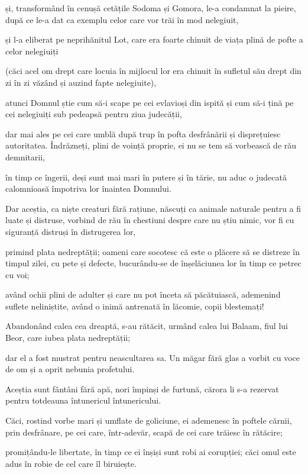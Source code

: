 {și, transformând în cenușă cetățile Sodoma și Gomora, le-a condamnat la pieire, după ce le-a dat ca exemplu celor care vor trăi în mod nelegiuit,

și l-a eliberat pe neprihănitul Lot, care era foarte chinuit de viața plină de pofte a celor nelegiuiți

(căci acel om drept care locuia în mijlocul lor era chinuit în sufletul său drept din zi în zi văzând și auzind fapte nelegiuite),

atunci Domnul știe cum să-i scape pe cei evlavioși din ispită și cum să-i țină pe cei nelegiuiți sub pedeapsă pentru ziua judecății,

dar mai ales pe cei care umblă după trup în pofta desfrânării și disprețuiesc autoritatea. Îndrăzneți, plini de voință proprie, ei nu se tem să vorbească de rău demnitarii,

în timp ce îngerii, deși sunt mai mari în putere și în tărie, nu aduc o judecată calomnioasă împotriva lor înaintea Domnului.

Dar aceștia, ca niște creaturi fără rațiune, născuți ca animale naturale pentru a fi luate și distruse, vorbind de rău în chestiuni despre care nu știu nimic, vor fi cu siguranță distruși în distrugerea lor,

primind plata nedreptății; oameni care socotesc că este o plăcere să se distreze în timpul zilei, cu pete și defecte, bucurându-se de înșelăciunea lor în timp ce petrec cu voi;

având ochii plini de adulter și care nu pot înceta să păcătuiască, ademenind suflete neliniștite, având o inimă antrenată în lăcomie, copii blestemați!

Abandonând calea cea dreaptă, s-au rătăcit, urmând calea lui Balaam, fiul lui Beor, care iubea plata nedreptății;

dar el a fost mustrat pentru neascultarea sa. Un măgar fără glas a vorbit cu voce de om și a oprit nebunia profetului.


\par }{\PP {}Aceștia sunt fântâni fără apă, nori împinși de furtună, cărora li s-a rezervat pentru totdeauna întunericul întunericului.

Căci, rostind vorbe mari și umflate de goliciune, ei ademenesc în poftele cărnii, prin desfrânare, pe cei care, într-adevăr, scapă de cei care trăiesc în rătăcire;

promițându-le libertate, în timp ce ei înșiși sunt robi ai corupției; căci omul este adus în robie de cel care îl biruiește.


}
